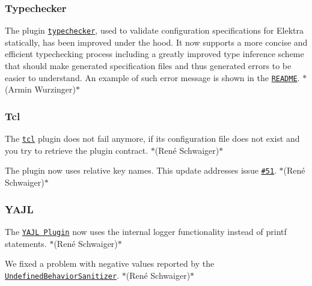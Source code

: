 \subsubsection*{Typechecker}


\begin{DoxyItemize}
\item The plugin \href{https://www.libelektra.org/plugins/typechecker}{\tt typechecker}, used to validate configuration specifications for Elektra statically, has been improved under the hood. It now supports a more concise and efficient typechecking process including a greatly improved type inference scheme that should make generated specification files and thus generated errors to be easier to understand. An example of such error message is shown in the \href{https://www.libelektra.org/plugins/typechecker}{\tt R\+E\+A\+D\+ME}. $\ast$(Armin Wurzinger)$\ast$
\end{DoxyItemize}

\subsubsection*{Tcl}


\begin{DoxyItemize}
\item The \href{http://libelektra.org/plugins/tcl}{\tt {\ttfamily tcl}} plugin does not fail anymore, if its configuration file does not exist and you try to retrieve the plugin contract. $\ast$(René Schwaiger)$\ast$
\item The plugin now uses relative key names. This update addresses issue \href{https://issues.libelektra.org/51}{\tt \#51}. $\ast$(René Schwaiger)$\ast$
\end{DoxyItemize}

\subsubsection*{Y\+A\+JL}


\begin{DoxyItemize}
\item The \href{http://libelektra.org/plugins/yajl}{\tt Y\+A\+JL Plugin} now uses the internal logger functionality instead of {\ttfamily printf} statements. $\ast$(René Schwaiger)$\ast$
\item We fixed a problem with negative values reported by the \href{https://clang.llvm.org/docs/UndefinedBehaviorSanitizer.html}{\tt Undefined\+Behavior\+Sanitizer}. $\ast$(René Schwaiger)$\ast$
\end{DoxyItemize}

